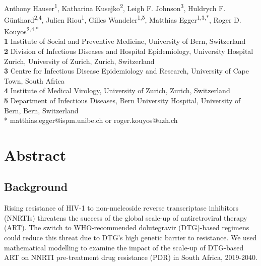 \documentclass[10pt,letterpaper]{article}
\begin{document}
\vspace*{0.2in}

\begin{flushleft}
{\Large
\textbf{} 
}
\newline
\\
Anthony Hauser\textsuperscript{1},
Katharina Kusejko\textsuperscript{2},
Leigh F. Johnson\textsuperscript{3},
Huldrych F. Günthard\textsuperscript{2,4},
Julien Riou\textsuperscript{1},
Gilles Wandeler\textsuperscript{1,5},
Matthias Egger\textsuperscript{1,3,*},
Roger D. Kouyos\textsuperscript{2,4,*}
\\
\bigskip
\textbf{1} Institute of Social and Preventive Medicine, University of Bern, Switzerland
\\
\textbf{2} Division of Infectious Diseases and Hospital Epidemiology, University Hospital Zurich, University of Zurich, Zurich, Switzerland
\\
\textbf{3} Centre for Infectious Disease Epidemiology and Research, University of Cape Town, South Africa
\\
\textbf{4} Institute of Medical Virology, University of Zurich, Zurich, Switzerland
\\
\textbf{5} Department of Infectious Diseases, Bern University Hospital, University of Bern, Bern, Switzerland
\\
\bigskip
* matthias.egger@ispm.unibe.ch or roger.kouyos@uzh.ch

\end{flushleft}
\section*{Abstract}
\subsection*{Background} Rising resistance of HIV-1 to non-nucleoside reverse transcriptase inhibitors (NNRTIs) threatens the success of the global scale-up of antiretroviral therapy (ART). The switch to WHO-recommended dolutegravir (DTG)-based regimens could reduce this threat due to DTG’s high genetic barrier to resistance. We used mathematical modelling to examine the impact of the scale-up of DTG-based ART on NNRTI pre-treatment drug resistance (PDR) in South Africa, 2019-2040.
\end{document}
